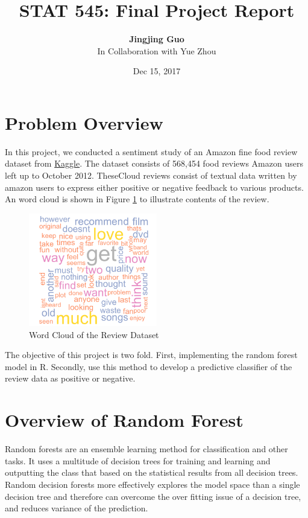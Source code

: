 \documentclass[11pt]{article}
\title{
	\vspace{2in}
	\textbf{STAT 545: Final Project Report}\\
	\vspace{4in} 
}
\author{\textbf{Jingjing Guo} \\In Collaboration with Yue Zhou}
\date{Dec 15, 2017} %
\begin{document}
\begin{titlepage}
	\maketitle
	\thispagestyle{empty}
\end{titlepage}

\tableofcontents
\newpage

\section{Problem Overview}
In this project, we conducted a sentiment study of an Amazon fine food review dataset from \href{https://www.kaggle.com/snap/amazon-fine-food-reviews}{Kaggle}. The dataset consists of 568,454 food reviews Amazon users left up to October 2012\cite{rf1}. TheseCloud reviews consist of textual data written by amazon users to express either positive or negative feedback to various products.  An word cloud is shown in Figure \ref{wordCloud} to illustrate contents of the review. \\

\begin{minipage}{\textwidth}		
	\begin{figure}[H]
		\centering
		\includegraphics[width=0.5\textwidth]{wc}
		\caption{Word Cloud of the Review Dataset}
		\label{wordCloud}
	\end{figure}
\end{minipage} \hfill

The objective of this project is two fold. First, implementing the random forest model in R. Secondly, use this method to develop a predictive classifier of the review data as positive or negative.\\
\section{Overview of Random Forest}
Random forests are an ensemble learning method for classification and other tasks. It uses a multitude of decision trees for training and learning and outputting the class that based on the statistical results from all decision trees. Random decision forests more effectively explores the model space than a single decision tree and therefore can overcome the over fitting issue of a decision tree, and reduces variance of the prediction.\\
\end{document}
